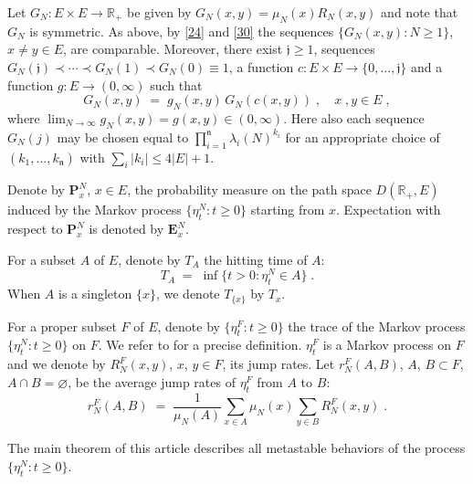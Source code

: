 \documentclass[reqno]{amsart}
\begin{document}
Let $G_N: E\times E\to {{\mathbb R}}_+$ be given by $G_N(x,y) = \mu_N(x)
R_N(x,y)$ and note that $G_N$ is symmetric. As above, by \eqref{24}
and \eqref{30} the sequences $\{G_N(x,y) : N\ge 1\}$, $x\not = y \in
E$, are comparable. Moreover, there exist ${{\mathfrak j}} \ge 1$, sequences
$G_N({{\mathfrak j}}) \prec \cdots \prec G_N(1) \prec G_N(0) \equiv 1$, a
function $c:E\times E \to \{0, \dots, {{\mathfrak j}}\}$ and a function $g: E
\to (0,\infty)$ such that
\begin{equation}
\label{27}
G_N(x,y) \;=\; g_N(x,y) \, G_N(c(x,y))\;, \quad x\;, y \in E\;,
\end{equation}
where $\lim_{N\to\infty} g_N(x,y) = g(x,y) \in (0,\infty)$.  Here also
each sequence $G_N(j)$ may be chosen equal to $\prod_{i=1}^{{{\mathfrak n}}}
\lambda_i(N)^{k_i}$ for an appropriate choice of $(k_1, \dots, k_{{{\mathfrak n}}})$ with $\sum_i |k_i|\le 4 |E|+1$.
\smallskip

Denote by ${{\mathbf P}}_x^N$, $x\in E$, the probability measure on the path
space $D({{\mathbb R}}_+, E)$ induced by the Markov process $\{\eta^N_t : t\ge
0\}$ starting from $x$. Expectation with respect to ${{\mathbf P}}_x^N$ is
denoted by ${{\mathbf E}}_x^N$.

For a subset $A$ of $E$, denote by $T_A$ the
hitting time of $A$:
\begin{equation*}
T_A \;=\; \inf\{t>0 : \eta^N_t \in A\}\; .
\end{equation*}
When $A$ is a singleton $\{x\}$, we denote $T_{\{x\}}$ by $T_x$.

For a proper subset $F$ of $E$, denote by $\{\eta^{F}_t : t\ge 0\}$
the trace of the Markov process $\{\eta^{N}_t : t\ge 0\}$ on $F$. We
refer to \cite[Section 2]{bl2} for a precise definition.  $\eta^{F}_t$
is a Markov process on $F$ and we denote by $R^{F}_N(x,y)$, $x$, $y\in
F$, its jump rates. Let $r^{F}_N(A,B)$, $A$, $B\subset F$, $A\cap
B=\varnothing$, be the average jump rates of $\eta^{F}_t$ from $A$
to $B$:
\begin{equation}
\label{35}
r^{F}_N(A,B) \;=\; \frac{1}{\mu_N(A)}  \sum_{x\in A} 
\mu_N(x) \sum_{y\in B} R^{F}_N(x,y)\;.
\end{equation}

The main theorem of this article describes all metastable behaviors of
the process $\{\eta^N_t : t\ge 0\}$.
\end{document}
